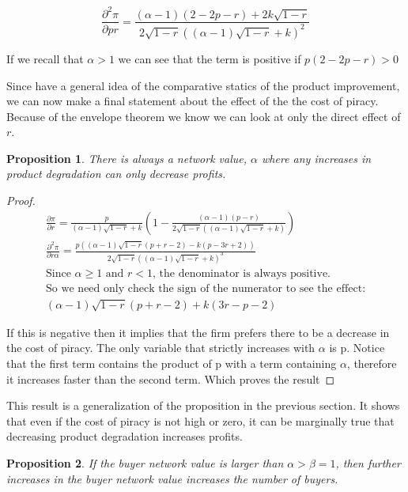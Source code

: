 \documentclass[11pt]{article}
\newtheorem{proposition}{Proposition}
\begin{document}
\begin{equation*}
\frac{\partial^2 \pi }{\partial p r} = \frac{(\alpha -1)(2-2 p-r)+2 k \sqrt{1-r}}{2 \sqrt{1-r} \left((\alpha-1) \sqrt{1-r}+k\right)^2}
\end{equation*}

If we recall that $\alpha>1$ we can see that the term is positive if $p(2-2p-r)>0$



Since have a general idea of the comparative statics of the product improvement, we can now make a final statement about the effect of the the cost of piracy. Because of the envelope theorem we know we can look at only the direct effect of $r$.

\begin{proposition}
There is always a network value, $\alpha$ where any increases in product degradation can only decrease profits.
\end{proposition}

\begin{proof}
\begin{align*}
\frac{\partial \pi }{\partial r}
=
\frac{p}{(\alpha-1) \sqrt{1-r}+k} \left(1-\frac{(\alpha-1) (p-r)}{2 \sqrt{1-r} \left((\alpha-1) \sqrt{1-r}+k\right)}\right)
\\
\frac{\partial^2 \pi }{\partial r \alpha}
= \frac{p \left((\alpha-1) \sqrt{1-r} (p+r-2)-k (p-3 r+2)\right)}{2 \sqrt{1-r} \left((\alpha-1) \sqrt{1-r}+k\right)^3} \\
\text{Since $\alpha \geq 1$ and $r<1$, the denominator is always positive.}\\ \text{So we need only check the sign of the numerator to see the effect:} \\
(\alpha-1) \sqrt{1-r} (p+r-2)+k (3 r-p-2)
\end{align*}

If this is negative then it implies that the firm prefers there to be a decrease in the cost of piracy. The only variable that strictly increases with $\alpha$ is p. Notice that the first term contains the product of p with a term containing $\alpha$, therefore it increases faster than the second term. Which proves the result
\end{proof}

This result is a generalization of the proposition in the previous section. It shows that even if the cost of piracy is not high or zero, it can be marginally true that decreasing product degradation increases profits. 

\begin{proposition}
If the buyer network value is larger than $\alpha>\beta=1$, then further increases in the buyer network value increases the number of buyers. 
\end{proposition}
\end{document}
